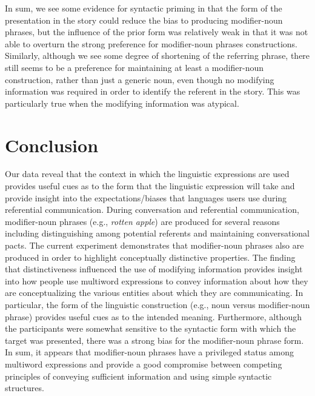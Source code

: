 \documentclass[output=paper]{langsci/langscibook}
\begin{document}
In sum, we see some evidence for syntactic priming in that the form of
the presentation in the story could reduce the bias to producing
modifier-noun phrases, but the influence of the prior form was
relatively weak in that it was not able to overturn the strong
preference for modifier-noun phrases constructions. Similarly,
although we see some degree of shortening of the referring phrase,
there still seems to be a preference for maintaining at least a
modifier-noun construction, rather than just a generic noun, even
though no modifying information was required in order to identify the
referent in the story. This was particularly true when the modifying
information was atypical.


\section{Conclusion}

Our data reveal that the context in which the linguistic expressions
are used provides useful cues as to the form that the linguistic
expression will take and provide insight into the expectations/biases
that languages users use during referential communication. During
conversation and referential communication, modifier-noun phrases
(e.g., \textit{rotten apple}) are produced for several reasons
including distinguishing among potential referents and maintaining
conversational pacts. The current experiment demonstrates that
modifier-noun phrases also are produced in order to highlight
conceptually distinctive properties. The finding that distinctiveness
influenced the use of modifying information provides insight into how
people use multiword expressions to convey information about how they
are conceptualizing the various entities about which they are
communicating. In particular, the form of the linguistic construction
(e.g., noun versus modifier-noun phrase) provides useful cues as to
the intended meaning. Furthermore, although the participants were
somewhat sensitive to the syntactic form with which the target was
presented, there was a strong bias for the modifier-noun phrase form.
In sum, it appears that modifier-noun phrases have a privileged status
among multiword expressions and provide a good compromise between
competing principles of conveying sufficient information and using
simple syntactic structures.



{\sloppy\printbibliography[heading=subbibliography,notkeyword=this]}
\end{document}
